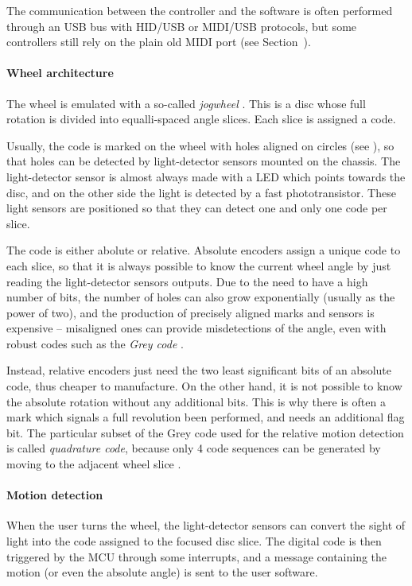 \documentclass[a4paper,10pt]{article}
\begin{document}
\begin{multicols}{2}
The communication between the controller and the software is often performed
through an USB bus with HID/USB or MIDI/USB protocols, but some controllers
still rely on the plain old MIDI port (see Section~\CITEME).


\paragraph{Wheel architecture}
The wheel is emulated with a so-called \emph{jogwheel} \INSFIG. This is a disc
whose full rotation is divided into equalli-spaced angle slices. Each slice is
assigned a code.

Usually, the code is marked on the wheel with holes aligned on circles (see
\INSFIG), so that holes can be detected by light-detector sensors mounted on
the chassis. The light-detector sensor is almost always made with a LED which
points towards the disc, and on the other side the light is detected by a fast
phototransistor. These light sensors are positioned so that they can detect
one and only one code per slice.

The code is either abolute or relative. Absolute encoders assign a unique code
to each slice, so that it is always possible to know the current wheel angle
by just reading the light-detector sensors outputs. Due to the need to have a
high number of bits, the number of holes can also grow exponentially (usually
as the power of two), and the production of precisely aligned marks and
sensors is expensive -- misaligned ones can provide misdetections of the
angle, even with robust codes such as the \emph{Grey code} \CITEME.

Instead, relative encoders just need the two least significant bits of an
absolute code, thus cheaper to manufacture. On the other hand, it is not
possible to know the absolute rotation without any additional bits. This is
why there is often a mark which signals a full revolution been performed, and
needs an additional flag bit. The particular subset of the Grey code used for
the relative motion detection is called \emph{quadrature code}, because only 4
code sequences can be generated by moving to the adjacent wheel slice \CITEME.


\paragraph{Motion detection}
When the user turns the wheel, the light-detector sensors can convert the
sight of light into the code assigned to the focused disc slice. The digital
code is then triggered by the MCU through some interrupts, and a message
containing the motion (or even the absolute angle) is sent to the user
software.


\end{multicols}
\end{document}
